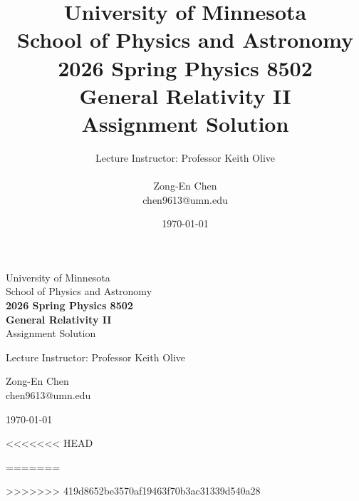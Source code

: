 \documentclass[12pt,letterpaper]{article}
\title{University of Minnesota\\
School of Physics and Astronomy\\
\textbf{2026 Spring Physics 8502 \\ General Relativity II}\\ 
Assignment Solution}
\author{Lecture Instructor: Professor Keith Olive \\ \\
        Zong-En Chen\\ chen9613@umn.edu}
\date{\today}
\begin{document}
\onehalfspacing
\begin{titlepage}
    \centering
    \vspace*{\fill} %
    {\LARGE University of Minnesota\\
    School of Physics and Astronomy\\[1em]
    \textbf{2026 Spring Physics 8502 \\ General Relativity II}\\ 
    Assignment Solution \par}
    \vspace{2cm}
    {\large Lecture Instructor: Professor Keith Olive \par}
    \vspace{1cm}
    {\large Zong-En Chen\\ chen9613@umn.edu \par}
    \vspace{2cm}
    {\large \today \par}
    \vspace*{\fill} %
\end{titlepage}

<<<<<<< HEAD








=======
%
%
%
%
%
%

>>>>>>> 419d8652be3570af19463f70b3ac31339d540a28
\end{document}
